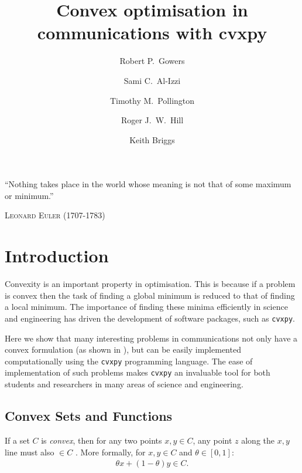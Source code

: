 \documentclass[twocolumn,secnumarabic,amssymb, nobibnotes, aps, prl,superscriptaddress]{revtex4-1}
\newcommand{\NewsItem}[1]{%
		\large #1 \vspace{4pt}
		\par \normalsize \normalfont}
\newcommand{\NewsAuthor}[1]{%
			\hfill \textsc{#1} \vspace{4pt}
			\par \normalfont}
\begin{document}

\title{Convex optimisation in communications with cvxpy}

\author{Robert P.~Gowers}%
\author{Sami C.~Al-Izzi}%
\author{Timothy M.~Pollington}%
\author{Roger J.~W.~Hill}%
\author{Keith Briggs}

\maketitle

	\NewsItem{``Nothing takes place in the world whose meaning is not that of some maximum or minimum.''}
	\NewsAuthor{Leonard Euler (1707-1783)}
    
\section{Introduction}
Convexity is an important property in optimisation. This is because if a problem is convex then the task of finding a global minimum is reduced to that of finding a local minimum. The importance of finding these minima efficiently in science and engineering has driven the development of software packages, such as \texttt{cvxpy}.

Here we show that many interesting problems in communications not only have a convex formulation (as shown in \cite{cvxpybook}), but can be easily implemented computationally using the \texttt{cvxpy} programming language. The ease of implementation of such problems makes \texttt{cvxpy} an invaluable tool for both students and researchers in many areas of science and engineering.
\subsection{Convex Sets and Functions}

If a set $C$ is \textit{convex}, then for any two points $x,y\in C$, any point $z$ along the $x,y$ line must also $\in C$ \cite[p.23]{cvxpybook}. More formally, for $x,y\in C$ and $\theta\in [0,1]$:
\begin{align}
\theta x + (1-\theta)y\in C.
\end{align}
\end{document}
